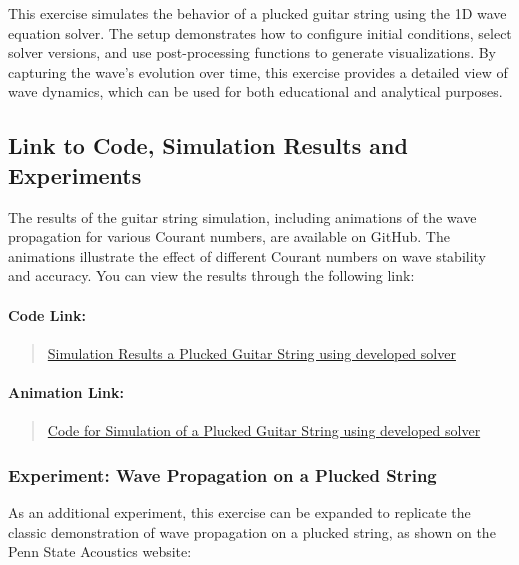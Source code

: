 \documentclass{article}
\begin{document}
			This exercise simulates the behavior of a plucked guitar string using the 1D wave equation solver. The setup demonstrates how to configure initial conditions, select solver versions, and use post-processing functions to generate visualizations. By capturing the wave's evolution over time, this exercise provides a detailed view of wave dynamics, which can be used for both educational and analytical purposes.
			
			\subsection{Link to Code, Simulation Results and Experiments}
			
			The results of the guitar string simulation, including animations of the wave propagation for various Courant numbers, are available on GitHub. The animations illustrate the effect of different Courant numbers on wave stability and accuracy. You can view the results through the following link:
			
			\paragraph{Code Link:}
			\begin{quote}
				\href{https://github.com/pb96git/Numerical-Solutions-for-Partial-Differential-Equations/blob/main/Part_2_WaveEquation/Example_Codes/guitar_string.py}{Simulation Results a Plucked Guitar String using developed solver}
			\end{quote}
			
			\paragraph{Animation Link:}
			\begin{quote}
				\href{https://github.com/pb96git/Numerical-Solutions-for-Partial-Differential-Equations/tree/main/Part_2_WaveEquation/Animations_postProcessing/guitar_string_diff_Cu}{Code for Simulation of a Plucked Guitar String using developed solver}
			\end{quote}
			
			\subsubsection{Experiment: Wave Propagation on a Plucked String}
			
			As an additional experiment, this exercise can be expanded to replicate the classic demonstration of wave propagation on a plucked string, as shown on the Penn State Acoustics website:
			
\end{document}
